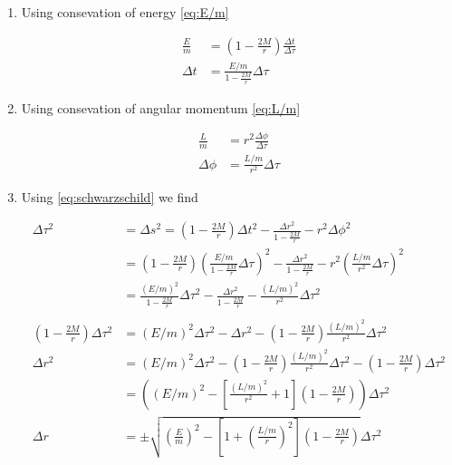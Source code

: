 \documentclass[a4paper,10pt,english]{article}
\begin{document}
\begin{enumerate}

\item Using consevation of energy \ref{eq:E/m}

\begin{align*}
\frac{E}{m}&=\left(1-\frac{2M}{r}\right)\frac{\Delta t}{\Delta\tau}\\
\Delta t&=\frac{E/m}{1-\frac{2M}{r}}\Delta\tau
\end{align*}

\item Using consevation of angular momentum \ref{eq:L/m}

\begin{align*}
\frac{L}{m}&=r^{2}\frac{\Delta\phi}{\Delta\tau}\\
\Delta\phi&=\frac{L/m}{r^{2}}\Delta\tau
\end{align*}

\item Using \ref{eq:schwarzschild} we find

\begin{align*}
\Delta\tau^{2}&=\Delta s^{2}=\left(1-\frac{2M}{r}\right)\Delta t^{2}-\frac{\Delta r^{2}}{1-\frac{2M}{r}}-r^{2}\Delta\phi^{2}\\
&=\left(1-\frac{2M}{r}\right)\left(\frac{E/m}{1-\frac{2M}{r}}\Delta\tau\right)^{2}-\frac{\Delta r^{2}}{1-\frac{2M}{r}}-r^{2}\left(\frac{L/m}{r^{2}}\Delta\tau\right)^{2}\\
&=\frac{(E/m)^{2}}{1-\frac{2M}{r}}\Delta\tau^{2}-\frac{\Delta r^{2}}{1-\frac{2M}{r}}-\frac{(L/m)^{2}}{r^{2}}\Delta\tau^{2}\\ \\
\left(1-\frac{2M}{r}\right)\Delta\tau^{2}&=(E/m)^{2}\Delta\tau^{2}-\Delta r^{2}-\left(1-\frac{2M}{r}\right)\frac{(L/m)^{2}}{r^{2}}\Delta\tau^{2}\\
\Delta r^{2}&=(E/m)^{2}\Delta\tau^{2}-\left(1-\frac{2M}{r}\right)\frac{(L/m)^{2}}{r^{2}}\Delta\tau^{2}-\left(1-\frac{2M}{r}\right)\Delta\tau^{2}\\
&=\left((E/m)^{2}-\left[\frac{(L/m)^{2}}{r^{2}}+1\right]\left(1-\frac{2M}{r}\right)\right)\Delta\tau^{2}\\
\Delta r&=\pm\sqrt{\left(\frac{E}{m}\right)^{2}-\left[1+\left(\frac{L/m}{r}\right)^{2}\right]\left(1-\frac{2M}{r}\right)}\Delta\tau^{2}
\end{align*}

\end{enumerate}
\end{document}
